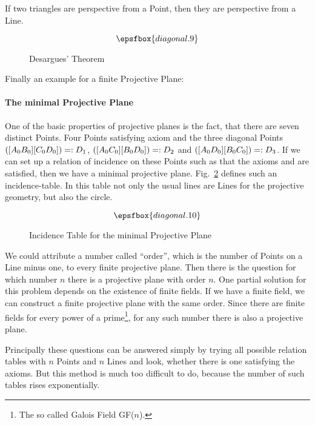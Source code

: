 \begin{theorem} If two triangles are perspective
from a Point, then they are perspective from a Line.
\end{theorem}

\begin{figure}[ht]
  \[\epsfbox{diagonal.9}\]
  \caption{Desargues' Theorem}
  \label{skizze:desargues}
\end{figure}

Finally an example for a finite Projective Plane:
\paragraph{The minimal Projective Plane%
\label{:projective:examples:minimal}}
One of the basic properties of projective planes is the fact, that
there are seven distinct Points. Four Points satisfying axiom \peiii and the 
three diagonal Points $([A_0B_0][C_0D_0])=: D_1$, $([A_0C_0][B_0D_0])=:
D_2$ and $([A_0D_0][B_0C_0])=:D_3$. If we can set up a relation of
incidence on these Points such as that the axioms \pei and \peii are
satisfied, then we have a minimal projective plane. 
Fig.~\ref{skizze:minimal} defines such an incidence-table. In this
table not only the usual lines are Lines for the projective geometry,
but also the circle. 

\begin{figure}[ht] 
  \[\epsfbox{diagonal.10}\]
  \caption{Incidence Table for the minimal Projective Plane%
    \label{skizze:minimal}}
\end{figure}

We could attribute a number called ``order'',
which is the number of Points on a Line minus one, to every finite
projective plane. Then there is the
question for which number $n$ there is a projective plane with order $n$.
One partial solution for this problem depends on the existence of finite
fields. If we have a finite field, we can construct a finite
projective plane with the same order. Since there are finite fields
for every power of a prime\footnote{The so called Galois Field GF($n$).},
for any such number there is also a projective plane. 

Principally these questions can be answered simply by trying all 
possible relation tables with $n$ Points and $n$ Lines and look, whether
there is one satisfying the axioms. But this method is much too
difficult to do, because the number of such tables rises exponentially.

%
